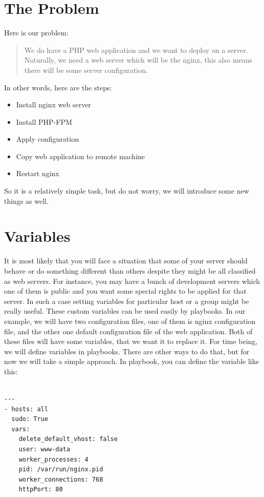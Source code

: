 \documentclass[10pt]{book}
\begin{document}
\section{The Problem}
Here is our problem:

\begin{quote}
We do have a PHP web application and we want to deploy on a server. Naturally, we need a web server
which will be the nginx, this also means there will be some server 
configuration.
\end{quote}

In other words, here are the steps:
\begin{itemize}
\item Install nginx web server 
\item Install  PHP-FPM
\item Apply configuration
\item Copy web application to remote machine
\item Restart nginx
\end{itemize}

So it is a relatively simple task, but do not worry, we will introduce some new 
things as well.

\section{Variables}
It is most likely that you will face a situation that some of your server should 
behave or do something different than others despite they might be all classified as web servers. 
For instance, you may have a bunch of development servers which one of them is public and 
you want some special rights to be applied for that server. In such a case 
setting variables for particular host or a group might be really useful. 
These custom variables can be used easily by playbooks. In our example, we will 
have two configuration files, one of them is nginx configuration file, and the 
other one default configuration file of the web application. Both of these files 
will have some variables, that we want it to replace it. For time being, we will define 
variables in playbooks. There are other ways to do that, but for now we will 
take a simple approach. In playbook, you can define the variable like this:

\begin{verbatim}

---
- hosts: all
  sudo: True
  vars:
    delete_default_vhost: false
    user: www-data
    worker_processes: 4 
    pid: /var/run/nginx.pid
    worker_connections: 768
    httpPort: 80

\end{verbatim}
 
\end{document}

